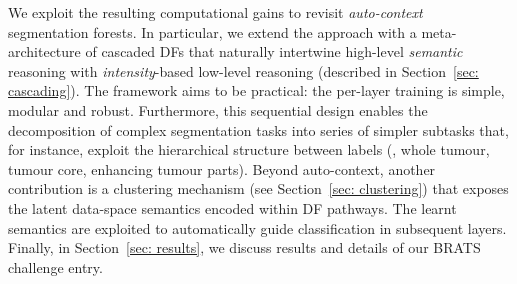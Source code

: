 We exploit the resulting computational gains to revisit \textit{auto-context}~\cite{tu2008auto,tu2010auto,shotton2008semantic} segmentation forests. 
In particular, we extend the approach with a meta-architecture of cascaded DFs that naturally 
intertwine high-level \textit{semantic} reasoning with \textit{intensity}-based low-level reasoning
(described in Section~\ref{sec: cascading}). The framework aims to be practical: the per-layer training is simple, modular and robust. Furthermore, this sequential design enables the 
decomposition of complex segmentation tasks into series of simpler subtasks that, for instance, exploit the hierarchical structure between labels (\eg, whole tumour, tumour core, enhancing tumour parts). Beyond auto-context, another
contribution is a clustering mechanism (see Section~\ref{sec: clustering}) that exposes the latent data-space semantics encoded within DF pathways. The 
learnt semantics are exploited to automatically guide classification in subsequent layers.
Finally, in Section~\ref{sec: results}, we discuss results and details of our BRATS challenge entry.



